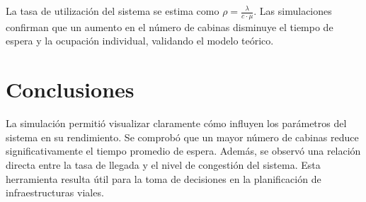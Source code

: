 \documentclass[12pt]{article}
\begin{document}
La tasa de utilización del sistema se estima como $\rho = \frac{\lambda}{c \cdot \mu}$. Las simulaciones confirman que un aumento en el número de cabinas disminuye el tiempo de espera y la ocupación individual, validando el modelo teórico.

\section{Conclusiones}
La simulación permitió visualizar claramente cómo influyen los parámetros del sistema en su rendimiento. Se comprobó que un mayor número de cabinas reduce significativamente el tiempo promedio de espera. Además, se observó una relación directa entre la tasa de llegada y el nivel de congestión del sistema. Esta herramienta resulta útil para la toma de decisiones en la planificación de infraestructuras viales.
\end{document}
